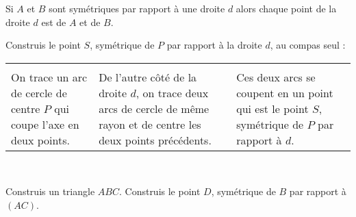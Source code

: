 
\begin{methode*1}

\begin{aconnaitre}
Si $A$ et $B$ sont symétriques par rapport à une droite $d$ alors chaque point de la droite $d$ est  de $A$ et de $B$. 
\end{aconnaitre}

\begin{exemple*1}
Construis le point $S$, symétrique de $P$ par rapport à la droite $d$, au compas seul : \\[0.5em]
\begin{tabularx}{\textwidth}{X|X|X}
  &
  &
  \\ 
 On trace un arc de cercle de centre $P$ qui coupe l'axe en deux points. & De l'autre côté de la droite $d$, on trace deux arcs de cercle de même rayon et de centre les deux points précédents. & Ces deux arcs se coupent en un point qui est le point $S$, symétrique de $P$ par rapport à $d$. \\
\end{tabularx} \\
 \end{exemple*1}


\exercice
Construis un triangle $ABC$. Construis le point $D$, symétrique de $B$ par rapport à $(AC)$.
 
\end{methode*1}


